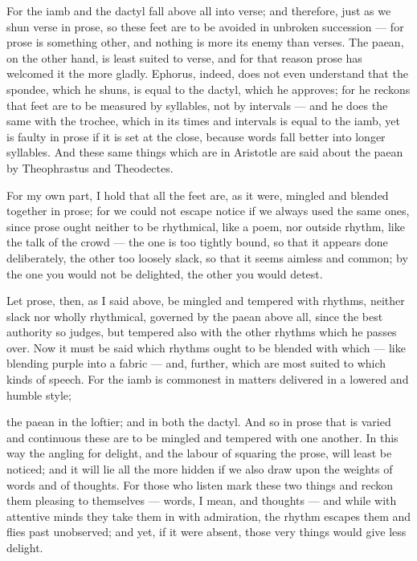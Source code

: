  For the iamb and the dactyl fall above all into verse; and therefore, just as we shun verse in prose, so these feet are to be avoided in unbroken succession — for prose is something other, and nothing is more its enemy than verses. The paean, on the other hand, is least suited to verse, and for that reason prose has welcomed it the more gladly. Ephorus, indeed, does not even understand that the spondee, which he shuns, is equal to the dactyl, which he approves; for he reckons that feet are to be measured by syllables, not by intervals — and he does the same with the trochee, which in its times and intervals is equal to the iamb, yet is faulty in prose if it is set at the close, because words fall better into longer syllables. And these same things which are in Aristotle are said about the paean by Theophrastus and Theodectes.

 For my own part, I hold that all the feet are, as it were, mingled and blended together in prose; for we could not escape notice if we always used the same ones, since prose ought neither to be rhythmical, like a poem, nor outside rhythm, like the talk of the crowd — the one is too tightly bound, so that it appears done deliberately, the other too loosely slack, so that it seems aimless and common; by the one you would not be delighted, the other you would detest.

 Let prose, then, as I said above, be mingled and tempered with rhythms, neither slack nor wholly rhythmical, governed by the paean above all, since the best authority so judges, but tempered also with the other rhythms which he passes over. Now it must be said which rhythms ought to be blended with which — like blending purple into a fabric — and, further, which are most suited to which kinds of speech. For the iamb is commonest in matters delivered in a lowered and humble style;

 the paean in the loftier; and in both the dactyl. And so in prose that is varied and continuous these are to be mingled and tempered with one another. In this way the angling for delight, and the labour of squaring the prose, will least be noticed; and it will lie all the more hidden if we also draw upon the weights of words and of thoughts. For those who listen mark these two things and reckon them pleasing to themselves — words, I mean, and thoughts — and while with attentive minds they take them in with admiration, the rhythm escapes them and flies past unobserved; and yet, if it were absent, those very things would give less delight.

